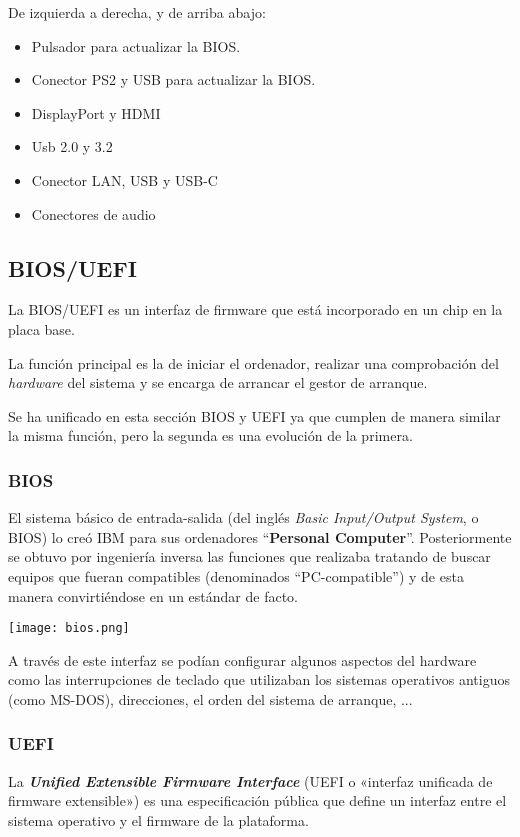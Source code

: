 De izquierda a derecha, y de arriba abajo:
\begin{itemize}
    \item Pulsador para actualizar la BIOS.
    \item Conector PS2 y USB para actualizar la BIOS.
    \item DisplayPort y HDMI
    \item Usb 2.0 y 3.2
    \item Conector LAN, USB y USB-C
    \item Conectores de audio
\end{itemize}


\subsection{BIOS/UEFI}
La BIOS/UEFI es un interfaz de firmware que está incorporado en un chip en la placa base.

La función principal es la de iniciar el ordenador, realizar una comprobación del \textit{hardware} del sistema  y se encarga de arrancar el gestor de arranque.

Se ha unificado en esta sección BIOS y UEFI ya que cumplen de manera similar la misma función, pero la segunda es una evolución de la primera.

\subsubsection{BIOS}

El sistema básico de entrada-salida (del inglés \textit{Basic Input/Output System}, o BIOS) lo creó IBM para sus ordenadores “\textbf{Personal Computer}”. Posteriormente se obtuvo por ingeniería inversa las funciones que realizaba tratando de buscar equipos  que fueran compatibles (denominados “PC-compatible”) y de esta manera convirtiéndose en un estándar de facto.

\begin{center}
    \texttt{[image: bios.png]}
\end{center}

A través de este interfaz se podían configurar algunos aspectos del hardware como las interrupciones de teclado que utilizaban los sistemas operativos antiguos (como MS-DOS), direcciones, el orden del sistema de arranque, ...


\subsubsection{UEFI}
La \textit{\textbf{Unified Extensible Firmware Interface}} (UEFI o «interfaz unificada de firmware extensible») es una especificación pública que define un interfaz entre el sistema operativo y el firmware de la plataforma.


